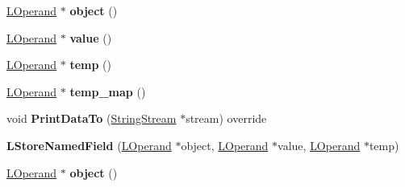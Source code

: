 \begin{DoxyCompactItemize}
\item 
\hyperlink{classv8_1_1internal_1_1_l_operand}{L\+Operand} $\ast$ {\bfseries object} ()\hypertarget{classv8_1_1internal_1_1_l_store_named_field_a322fe15f20a68dfd3429f31bb46ce109}{}\label{classv8_1_1internal_1_1_l_store_named_field_a322fe15f20a68dfd3429f31bb46ce109}

\item 
\hyperlink{classv8_1_1internal_1_1_l_operand}{L\+Operand} $\ast$ {\bfseries value} ()\hypertarget{classv8_1_1internal_1_1_l_store_named_field_a7c1b623b85070a53e7c8ca36113808c7}{}\label{classv8_1_1internal_1_1_l_store_named_field_a7c1b623b85070a53e7c8ca36113808c7}

\item 
\hyperlink{classv8_1_1internal_1_1_l_operand}{L\+Operand} $\ast$ {\bfseries temp} ()\hypertarget{classv8_1_1internal_1_1_l_store_named_field_ad77491ce510eaa0f150539ec8815c14f}{}\label{classv8_1_1internal_1_1_l_store_named_field_ad77491ce510eaa0f150539ec8815c14f}

\item 
\hyperlink{classv8_1_1internal_1_1_l_operand}{L\+Operand} $\ast$ {\bfseries temp\+\_\+map} ()\hypertarget{classv8_1_1internal_1_1_l_store_named_field_a69d1d376feceac483680f42a3a6989b9}{}\label{classv8_1_1internal_1_1_l_store_named_field_a69d1d376feceac483680f42a3a6989b9}

\item 
void {\bfseries Print\+Data\+To} (\hyperlink{classv8_1_1internal_1_1_string_stream}{String\+Stream} $\ast$stream) override\hypertarget{classv8_1_1internal_1_1_l_store_named_field_a737f49c6847cd030f17c69b314c54b6c}{}\label{classv8_1_1internal_1_1_l_store_named_field_a737f49c6847cd030f17c69b314c54b6c}

\item 
{\bfseries L\+Store\+Named\+Field} (\hyperlink{classv8_1_1internal_1_1_l_operand}{L\+Operand} $\ast$object, \hyperlink{classv8_1_1internal_1_1_l_operand}{L\+Operand} $\ast$value, \hyperlink{classv8_1_1internal_1_1_l_operand}{L\+Operand} $\ast$temp)\hypertarget{classv8_1_1internal_1_1_l_store_named_field_a6d2a4f20bdb4927c9401f7f7dd706d15}{}\label{classv8_1_1internal_1_1_l_store_named_field_a6d2a4f20bdb4927c9401f7f7dd706d15}

\item 
\hyperlink{classv8_1_1internal_1_1_l_operand}{L\+Operand} $\ast$ {\bfseries object} ()\hypertarget{classv8_1_1internal_1_1_l_store_named_field_a322fe15f20a68dfd3429f31bb46ce109}{}\label{classv8_1_1internal_1_1_l_store_named_field_a322fe15f20a68dfd3429f31bb46ce109}


\end{DoxyCompactItemize}
